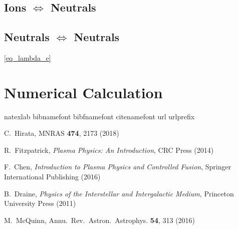 \documentclass{article}
\begin{document}
\subsection{Ions $\Longleftrightarrow$ Neutrals}

\subsection{Neutrals $\Longleftrightarrow$ Neutrals}
\ref{eq_lambda_e}
\section{Numerical Calculation}

\label{section_model_comparision}


\begin{thebibliography}{95}
\expandafter\ifx\csname natexlab\endcsname\relax\def\natexlab#1{#1}\fi
\expandafter\ifx\csname bibnamefont\endcsname\relax
  \def\bibnamefont#1{#1}\fi
\expandafter\ifx\csname bibfnamefont\endcsname\relax
  \def\bibfnamefont#1{#1}\fi
\expandafter\ifx\csname citenamefont\endcsname\relax
  \def\citenamefont#1{#1}\fi
\expandafter\ifx\csname url\endcsname\relax
  \def\url#1{\texttt{#1}}\fi
\expandafter\ifx\csname urlprefix\endcsname\relax\def\urlprefix{URL }\fi
\providecommand{\bibinfo}[2]{#2}
\providecommand{\eprint}[2][]{\url{#2}}
  
  
	C.~Hirata,
	MNRAS {\bf 474}, 2173 (2018)

	R.~Fitzpatrick,
	\textit{Plasma Physics: An Introduction},
	CRC Press (2014)

	F.~Chen,
	\textit{Introduction to Plasma Physics and Controlled Fusion},
	Springer International Publishing (2016)

	B.~Draine,
	\textit{Physics of the Interstellar and Intergalactic Medium},
	Princeton University Press (2011)

	M.~McQuinn,
	Annu.\ Rev.\ Astron.\ Astrophys. {\bf 54}, 313 (2016)
 

\end{thebibliography}
\end{document}
